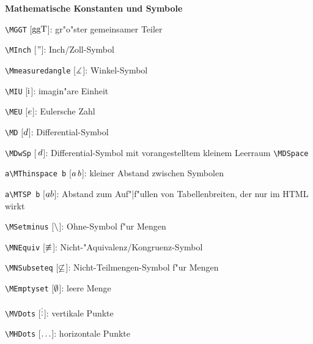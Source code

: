 \bigbreak\par\noindent
{\LARGE\sf\bfseries Mathematische Konstanten und Symbole}
\medskip\par\noindent
{\color{blue}\verb+\MGGT+}
[{\color{red}$\mathrm{ggT}$}]: gr"o"ster gemeinsamer Teiler
\smallskip\par\noindent
{\color{blue}\verb+\MInch+}
[{\color{red}$\text{''}$}]: Inch/Zoll-Symbol
\smallskip\par\noindent
{\color{blue}\verb+\Mmeasuredangle+}
[{\color{red}$\measuredangle$}]: Winkel-Symbol
\smallskip\par\noindent
{\color{blue}\verb+\MIU+}
[{\color{red}$\mathrm{i}$}]: imagin"are Einheit
\smallskip\par\noindent
{\color{blue}\verb+\MEU+}
[{\color{red}$e$}]: Eulersche Zahl
\smallskip\par\noindent
{\color{blue}\verb+\MD+}
[{\color{red}$d$}]: Differential-Symbol
\smallskip\par\noindent
{\color{blue}\verb+\MDwSp+}
[{\color{red}$\,d$}]: Differential-Symbol mit vorangestelltem kleinem Leerraum
{\color{blue}\verb+\MDSpace+}
\smallskip\par\noindent
{\color{cyan}\verb+a+}{\color{blue}\verb+\MThinspace +}{\color{cyan}\verb+b+}
[{\color{magenta}$a{\color{red}\,{}}b$}]: kleiner Abstand zwischen Symbolen
\smallskip\par\noindent
{\color{cyan}\verb+a+}{\color{blue}\verb+\MTSP +}{\color{cyan}\verb+b+}
[{\color{magenta}$a{\color{red}{}}b$}]: Abstand zum Auf"|f"ullen von Tabellenbreiten, der nur im HTML wirkt
\smallskip\par\noindent
{\color{blue}\verb+\MSetminus+}
[{\color{red}$\setminus$}]: Ohne-Symbol f"ur Mengen
\smallskip\par\noindent
{\color{blue}\verb+\MNEquiv+}
[{\color{red}$\not\equiv$}]: Nicht-"Aquivalenz/Kongruenz-Symbol
\smallskip\par\noindent
{\color{blue}\verb+\MNSubseteq+}
[{\color{red}$\not\subseteq$}]: Nicht-Teilmengen-Symbol f"ur Mengen
\smallskip\par\noindent
{\color{blue}\verb+\MEmptyset+}
[{\color{red}$\emptyset$}]: leere Menge
\smallskip\par\noindent
{\color{blue}\verb+\MVDots+}
[{\color{red}$\vdots$}]: vertikale Punkte
\smallskip\par\noindent
{\color{blue}\verb+\MHDots+}
[{\color{red}$\hdots$}]: horizontale Punkte
\smallskip\par\noindent

